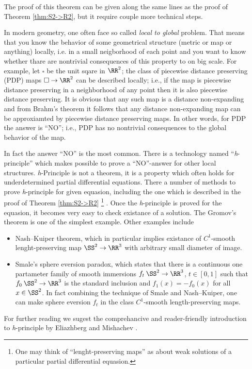 The proof of this theorem can be given along the same lines as the proof of Theorem \ref{thm:S2->R2},
but it require couple more technical steps.

In modern geometry, one often face so called \textit{local to global} problem.
That means that you know the behavior of some geometrical structure (metric or map or anything)
locally, i.e. in a small neigborhood of each point and you want to know whether thare are nontrivial consequences of this property to on big scale.
For example,
let $\square$ be the unit sqare in $\RR^2$;
the class of piecewise distance preserving (PDP) maps $\square\to\RR^2$ 
can be described locally; 
i.e., if the map is piecewise distance preserving in a neighborhood of any point then it is also piecewise distance preserving.
It is obvious that any such map is a distance non-expanding
and from Brahm's theorem it follows that any distance non-expanding map can be approxiamted by piecewise distance preserving maps.
In other words, for  PDP the answer is ``NO'';
i.e.,  PDP has no nontrivial consequences to the global behavior of the map.

In fact the answer ``NO'' is the most common.
There is a technology named ``\textit{h}-principle'' which makes possible to prove a ``NO''-answer for other local structures.
\textit{h}-Principle is not a theorem, it is a property which often holds for underdetermined partial differential equations.
There a number of methods to prove \textit{h}-principle for given equasion, including the one which is described in the proof of Theorem \ref{thm:S2->R2}%
\footnote{One may think of ``lenght-preserving maps'' as about weak solutions of a particular partial differential equasion.}%
.
Once the \textit{h}-principle is proved for the equasion, 
it becomes very easy to check existance of a solution.
The Gromov's theorem is one of the simplest example.
Other examples include 
\begin{itemize}
\item Nash--Kuiper theorem, which in particular implies existance of $C^1$-smooth lenght-preserving map $\SS^2\to\RR^3$ with arbitrary small diameter of image.
\item Smale's sphere eversion paradox, which states that there is a continuous one partameter family of smooth immersions $f_t\:\SS^2\to \RR^3$, $t\in[0,1]$ such that $f_0\:\SS^2\to \RR^3$ is the standard inclusion and $f_1(x)=-f_0(x)$ for all $x\in \SS^2$.
In fact combining the technique of Smale and Nash--Kuiper, one can make sphere eversion $f_t$ in the class $C^1$-smooth length-preserving maps. 
\end{itemize}
 
For further reading we sugest the comprehancive and reader-friendly introduction to \textit{h}-principle by  Eliazhberg and Mishachev \cite{eliashberg-mishachev}.




